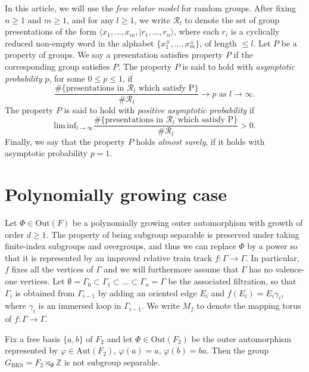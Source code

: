 In this article, we will use the \emph{few relator model} for random groups. After fixing $n \geq 1 $ and $m \geq 1$, and for any $l \geq 1$, we write $\mathcal{R}_l$ to denote the set of group presentations of the form $\langle x_1, \ldots, x_m, \mid r_1, \ldots, r_n \rangle$, where each $r_i$ is a cyclically reduced non-empty word in the alphabet $\{x_1^{\pm}, \ldots, x_m^{\pm}\}$, of length $\leq l$. Let $P$ be a property of groups. We say a presentation satisfies property $P$ if the corresponding group satisfies $P$. The property $P$ is said to hold with \emph{asymptotic probability $p$}, for some $0 \leq p \leq 1$, if 
\[\frac{\#\{ \text{presentations in }\mathcal{R}_l \text{ which satisfy P}\}}{\#\mathcal{R}_l} \to p \text{ as }l \to \infty.\]
The property $P$ is said to hold with \emph{positive asymptotic probability} if 
\[\mathrm{lim \, inf}_{l \to \infty} \frac{\#\{ \text{presentations in }\mathcal{R}_l \text{ which satisfy P}\}}{\#\mathcal{R}_l} > 0. \]
Finally, we say that the property $P$ holds \emph{almost surely}, if it holds with asymptotic probability $p = 1$.

\section{Polynomially growing case}

Let $\Phi \in \mathrm{Out}(F)$ be a polynomially growing outer automorphism with growth of order $d \geq 1$. The property of being subgroup separable is preserved under taking finite-index subgroups and overgroups, and thus we can replace $\Phi$ by a power so that it is represented by an improved relative train track $f \colon \Gamma \to \Gamma$. In particular, $f$ fixes all the vertices of $\Gamma$ and we will furthermore assume that $\Gamma$ has no valence-one vertices. Let $\emptyset = \Gamma_0 \subset \Gamma_1 \subset \ldots \subset \Gamma_n = \Gamma$ be the associated filtration, so that $\Gamma_i$ is obtained from $\Gamma_{i-1}$ by adding an oriented edge $E_i$ and $f(E_i) = E_i \gamma_i$, where $\gamma_i$ is an immersed loop in $\Gamma_{i-1}$. We write $M_f$ to denote the mapping torus of $f \colon \Gamma \to \Gamma$. 

\begin{thm}\emph{\cite{BKS}}\label{BKS} Fix a free basis $\{a,b\}$ of $F_2$ and let $\Phi \in \mathrm{Out}(F_2)$ be the outer automorphism represented by $\varphi \in \mathrm{Aut}(F_2)$, $\varphi(a) = a$, $\varphi(b) = ba$. Then the group $G_{\mathrm{BKS}}= F_2 \rtimes_{\Phi} \mathbb{Z}$ is not subgroup separable.
\end{thm}

